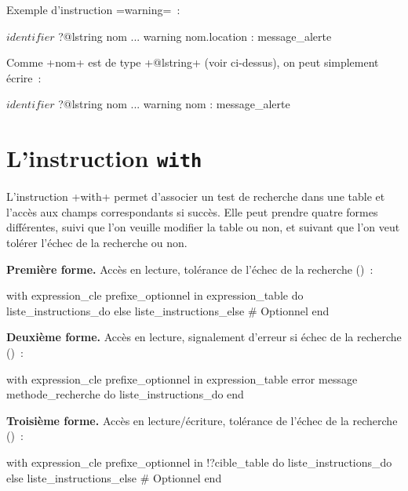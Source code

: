 Exemple d'instruction \ggst=warning=~:

\begin{galgas3}
$identifier$ ?@lstring nom
...
warning nom.location : message_alerte
\end{galgas3}

Comme \ggst+nom+ est de type \ggst+@lstring+ (voir ci-dessus), on peut simplement écrire~:
\begin{galgas3}
$identifier$ ?@lstring nom
...
warning nom : message_alerte
\end{galgas3}










\section{L'instruction \texttt{with}}

L'instruction \ggst+with+ permet d'associer un test de recherche dans une table et l'accès aux champs correspondants si succès. Elle peut prendre quatre formes différentes, suivi que l'on veuille modifier la table ou non, et suivant que l'on veut tolérer l'échec de la recherche ou non.

\textbf{Première forme.} Accès en lecture, tolérance de l'échec de la recherche ()~:
\begin{galgas3}
with expression_cle prefixe_optionnel in expression_table
do
  liste_instructions_do
else
  liste_instructions_else # Optionnel
end
\end{galgas3}

\textbf{Deuxième forme.} Accès en lecture, signalement d'erreur si échec de la recherche ()~:
\begin{galgas3}
with expression_cle prefixe_optionnel in expression_table
error message methode_recherche
do
  liste_instructions_do
end
\end{galgas3}



\textbf{Troisième forme.} Accès en lecture/écriture, tolérance de l'échec de la recherche ()~:
\begin{galgas3}
with expression_cle prefixe_optionnel in !?cible_table
do
  liste_instructions_do
else
  liste_instructions_else # Optionnel
end
\end{galgas3}

